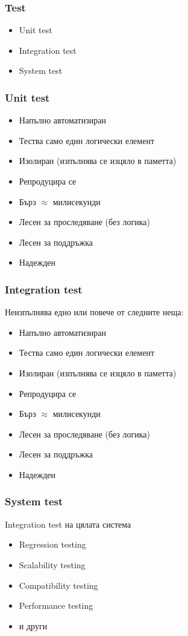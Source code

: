 \begin{frame}
  \frametitle{Test}
  \begin{itemize}
    \item Unit test
    \item Integration test
    \item System test
  \end{itemize}
\end{frame}


\begin{frame}
  \frametitle{Unit test}
  \begin{itemize}
    \item Напълно автоматизиран \pause
    \item Тества само един логически елемент \pause
    \item Изолиран (изпълнява се изцяло в паметта) \pause
    \item Репродуцира се \pause
    \item Бърз $\approx$ милисекунди \pause
    \item Лесен за проследяване (без логика) \pause
    \item Лесен за поддръжка \pause
    \item Надежден \pause
  \end{itemize}
\end{frame}


\begin{frame}
  \frametitle{Integration test}
  Неизпълнява едно или повече от следните неща: \pause
  \begin{itemize}
    \item Напълно автоматизиран \pause
    \item Тества само един логически елемент \pause
    \item Изолиран (изпълнява се изцяло в паметта) \pause
    \item Репродуцира се \pause
    \item Бърз $\approx$ милисекунди \pause
    \item Лесен за проследяване (без логика) \pause
    \item Лесен за поддръжка \pause
    \item Надежден \pause
  \end{itemize}
\end{frame}


\begin{frame}
  \frametitle{System test}
  Integration test на цялата система\pause
  \begin{itemize}
    \item Regression testing\pause
    \item Scalability testing\pause
    \item Compatibility testing\pause
    \item Performance testing\pause
    \item и други
  \end{itemize}
\end{frame}
